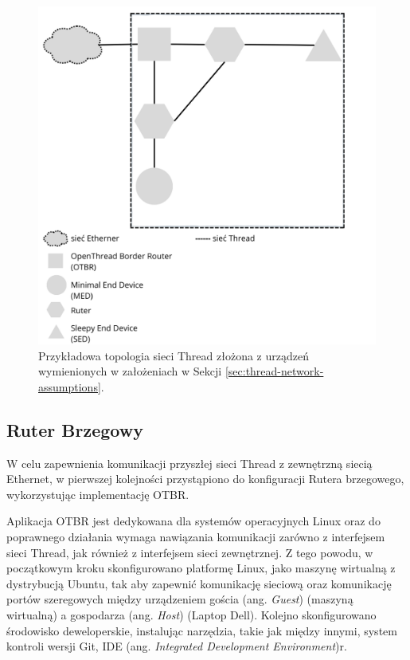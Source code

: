         \begin{figure}[H]
            \centering
            \includegraphics[width=0.8\linewidth]{graphics/thread-topology.png}
            \caption{Przykładowa topologia sieci Thread złożona z urządzeń wymienionych w założeniach w Sekcji \ref{sec:thread-network-assumptions}.}
            \label{fig:thread-topology}
        \end{figure}

    \subsection{Ruter Brzegowy}
    \label{subsec:otbr-implementation}

        W celu zapewnienia komunikacji przyszłej sieci Thread z zewnętrzną siecią Ethernet, w pierwszej kolejności przystąpiono do konfiguracji Rutera brzegowego, wykorzystując implementację OTBR. 
        
        Aplikacja OTBR jest dedykowana dla systemów operacyjnych Linux oraz do poprawnego działania wymaga nawiązania komunikacji zarówno z interfejsem sieci Thread, jak również z interfejsem sieci zewnętrznej. Z tego powodu, w początkowym kroku skonfigurowano platformę Linux, jako maszynę wirtualną z dystrybucją Ubuntu, tak aby zapewnić komunikację sieciową oraz komunikację portów szeregowych między urządzeniem gościa (ang. \textit{Guest}) (maszyną wirtualną) a gospodarza (ang. \textit{Host}) (Laptop Dell). Kolejno skonfigurowano środowisko deweloperskie, instalując narzędzia, takie jak między innymi, system kontroli wersji Git, IDE (ang. \textit{Integrated Development Environment})r. 

